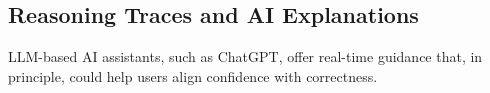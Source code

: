 \documentclass[manuscript,review,anonymous]{acmart}
\begin{document}


\subsection{Reasoning Traces and AI Explanations}
LLM-based AI assistants, such as ChatGPT, offer real-time guidance that, in principle, could help users align confidence with correctness. %
\end{document}
